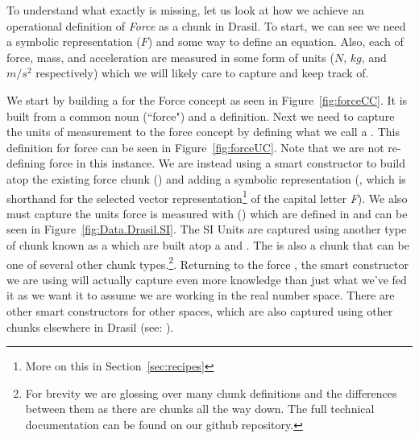 To understand what exactly is missing, let us look at how we achieve an 
operational definition of \emph{Force} as a chunk in Drasil. To start, we can 
see we need a symbolic representation ($F$) and some way to define an equation. 
Also, each of force, mass, and acceleration are measured in some form of units 
($N$, $kg$, and $m/s^2$ respectively) which we will likely care to capture and 
keep track of. 




We start by building a  for the Force concept as seen in 
Figure~\ref{fig:forceCC}. It is built from a common noun (``force") and a 
definition. Next we need to capture the units of measurement to the force 
concept by defining what we call a . This definition for 
force can be seen in Figure~\ref{fig:forceUC}. Note that we are not re-defining 
force in this instance. We are instead using a smart constructor to build atop 
the existing force chunk () and adding a symbolic 
representation (, which is shorthand for the selected vector 
representation\footnote{More on this in Section~\ref{sec:recipes}} of the 
capital letter \emph{F}). We also must capture the units force is measured with 
() which are defined in  and can be 
seen in Figure~\ref{fig:Data.Drasil.SI}. The SI Units are captured using 
another type of chunk known as a  which are built atop a 
 and . The  is also a 
chunk that can be one of several other chunk types.\footnote{For brevity we are 
glossing over many chunk definitions and the differences between them as there 
are chunks all the way down. The full technical documentation can be found on 
our github repository.}. Returning to the force , the smart 
constructor  we are using will actually capture even more knowledge 
than just what we've fed it as we want it to assume we are working in the real 
number space. There are other smart constructors for other spaces, which are 
also captured using other chunks elsewhere in Drasil (see: 
).

